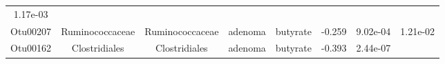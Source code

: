 \documentclass[11pt,]{article}
\begin{document}
\begin{longtable}[]{@{}cccccccc@{}}
\begin{minipage}[t]{0.08\columnwidth}
1.17e-03\strut
\end{minipage}\tabularnewline
\begin{minipage}[t]{0.08\columnwidth}\centering\strut
Otu00207\strut
\end{minipage} & \begin{minipage}[t]{0.15\columnwidth}\centering\strut
Ruminococcaceae\strut
\end{minipage} & \begin{minipage}[t]{0.15\columnwidth}\centering\strut
Ruminococcaceae\strut
\end{minipage} & \begin{minipage}[t]{0.08\columnwidth}\centering\strut
adenoma\strut
\end{minipage} & \begin{minipage}[t]{0.09\columnwidth}\centering\strut
butyrate\strut
\end{minipage} & \begin{minipage}[t]{0.07\columnwidth}\centering\strut
-0.259\strut
\end{minipage} & \begin{minipage}[t]{0.08\columnwidth}\centering\strut
9.02e-04\strut
\end{minipage} & \begin{minipage}[t]{0.08\columnwidth}\centering\strut
1.21e-02\strut
\end{minipage}\tabularnewline
\begin{minipage}[t]{0.08\columnwidth}\centering\strut
Otu00162\strut
\end{minipage} & \begin{minipage}[t]{0.15\columnwidth}\centering\strut
Clostridiales\strut
\end{minipage} & \begin{minipage}[t]{0.15\columnwidth}\centering\strut
Clostridiales\strut
\end{minipage} & \begin{minipage}[t]{0.08\columnwidth}\centering\strut
adenoma\strut
\end{minipage} & \begin{minipage}[t]{0.09\columnwidth}\centering\strut
butyrate\strut
\end{minipage} & \begin{minipage}[t]{0.07\columnwidth}\centering\strut
-0.393\strut
\end{minipage} & \begin{minipage}[t]{0.08\columnwidth}\centering\strut
2.44e-07\strut
\end{minipage} & \begin{minipage}[t]{0.08\columnwidth}\centering\strut

\end{minipage}
\end{longtable}
\end{document}
